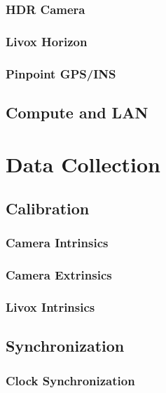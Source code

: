 \documentclass{erauthesis}
\begin{document}
            \subsubsection{HDR Camera}
            
            \subsubsection{Livox Horizon}
            
            \subsubsection{Pinpoint GPS/INS}
            
        \subsection{Compute and LAN}
        
    \section{Data Collection}
    
        \subsection{Calibration}
        
            \subsubsection{Camera Intrinsics}
            
            \subsubsection{Camera Extrinsics}
            
            \subsubsection{Livox Intrinsics}
            
        \subsection{Synchronization}
        
            \subsubsection{Clock Synchronization}
            
\end{document}
